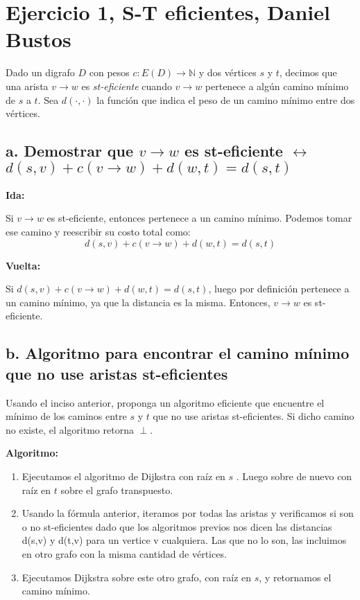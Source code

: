 \documentclass{article}
\begin{document}
\section*{Ejercicio 1, S-T eficientes, Daniel Bustos}

Dado un digrafo \( D \) con pesos \( c : E(D) \to \mathbb{N} \) y dos vértices \( s \) y \( t \), decimos que una arista \( v \to w \) es \textit{st-eficiente} cuando \( v \to w \) pertenece a algún camino mínimo de \( s \) a \( t \). Sea \( d(\cdot, \cdot) \) la función que indica el peso de un camino mínimo entre dos vértices.

\subsection*{a. Demostrar que \( v \to w \) es st-eficiente \(\leftrightarrow\) \( d(s, v) + c(v \to w) + d(w, t) = d(s, t) \)}

\textbf{Ida:}

Si \( v \to w \) es st-eficiente, entonces pertenece a un camino mínimo. Podemos tomar ese camino y reescribir su costo total como:
\[ d(s, v) + c(v \to w) + d(w, t) = d(s, t) \]

\textbf{Vuelta:}

Si \( d(s, v) + c(v \to w) + d(w, t) = d(s, t) \), luego por definición pertenece a un camino mínimo, ya que la distancia es la misma. Entonces, \( v \to w \) es st-eficiente.

\subsection*{b. Algoritmo para encontrar el camino mínimo que no use aristas st-eficientes}

Usando el inciso anterior, proponga un algoritmo eficiente que encuentre el mínimo de los caminos entre \( s \) y \( t \) que no use aristas st-eficientes. Si dicho camino no existe, el algoritmo retorna \(\perp\).

\textbf{Algoritmo:}
\begin{enumerate}
    \item Ejecutamos el algoritmo de Dijkstra con raíz en \( s \) . Luego sobre  de nuevo con raíz en \( t \) sobre el grafo transpuesto.
    \item Usando la fórmula anterior, iteramos por todas las aristas y verificamos si son o no st-eficientes dado que los algoritmos previos nos dicen las distancias d(s,v) y d(t,v) para un vertice v cualquiera. Las que no lo son, las incluimos en otro grafo con la misma cantidad de vértices.
    \item Ejecutamos Dijkstra sobre este otro grafo, con raíz en \( s \), y retornamos el camino mínimo.
\end{enumerate}
\end{document}
